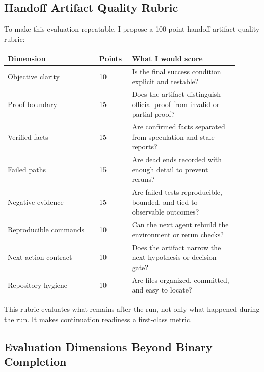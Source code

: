 \documentclass[a4paper,11pt]{article}
\begin{document}
\subsection{Handoff Artifact Quality Rubric}

To make this evaluation repeatable, I propose a 100-point handoff artifact quality rubric:

\begin{longtable}{L{0.36\linewidth} L{0.12\linewidth} L{0.42\linewidth}}
\toprule
Dimension & Points & What I would score\\
\midrule
Objective clarity & 10 & Is the final success condition explicit and testable?\\
Proof boundary & 15 & Does the artifact distinguish official proof from invalid or partial proof?\\
Verified facts & 15 & Are confirmed facts separated from speculation and stale reports?\\
Failed paths & 15 & Are dead ends recorded with enough detail to prevent reruns?\\
Negative evidence & 15 & Are failed tests reproducible, bounded, and tied to observable outcomes?\\
Reproducible commands & 10 & Can the next agent rebuild the environment or rerun checks?\\
Next-action contract & 10 & Does the artifact narrow the next hypothesis or decision gate?\\
Repository hygiene & 10 & Are files organized, committed, and easy to locate?\\
\bottomrule
\end{longtable}

This rubric evaluates what remains after the run, not only what happened during the run. It makes continuation readiness a first-class metric.

\subsection{Evaluation Dimensions Beyond Binary Completion}
\end{document}
